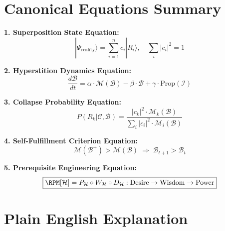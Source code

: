 \section{Canonical Equations Summary}
\label{sec:canonical-equations}

\begin{tcolorbox}[colback=blue!5!white,colframe=blue!75!black,title=\textbf{Canonical Hyperstition Equations}]

\textbf{1. Superposition State Equation:}
\begin{equation}
\boxed{
|\Psi_{\text{reality}}\rangle = \sum_{i=1}^{n} c_i |R_i\rangle, \quad \sum_i |c_i|^2 = 1
}
\end{equation}

\textbf{2. Hyperstition Dynamics Equation:}
\begin{equation}
\boxed{
\frac{d\mathcal{B}}{dt} = \alpha \cdot \mathcal{M}(\mathcal{B}) - \beta \cdot \mathcal{B} + \gamma \cdot \mathrm{Prop}(\mathcal{I})
}
\end{equation}

\textbf{3. Collapse Probability Equation:}
\begin{equation}
\boxed{
P(R_k | \mathcal{C}, \mathcal{B}) = \frac{|c_k|^2 \cdot \mathcal{M}_k(\mathcal{B})}{\sum_i |c_i|^2 \cdot \mathcal{M}_i(\mathcal{B})}
}
\end{equation}

\textbf{4. Self-Fulfillment Criterion Equation:}
\begin{equation}
\boxed{
\mathcal{M}(\mathcal{B}^+) > \mathcal{M}(\mathcal{B}) \;\Rightarrow\; \mathcal{B}_{t+1} > \mathcal{B}_t
}
\end{equation}

\textbf{5. Prerequisite Engineering Equation:}
\begin{equation}
\boxed{
\RPM[\mathcal{H}] = P_\mathcal{H} \circ W_\mathcal{H} \circ D_\mathcal{H} : \text{Desire} \to \text{Wisdom} \to \text{Power}
}
\end{equation}

\end{tcolorbox}

\section{Plain English Explanation}
\label{sec:plain-english}

